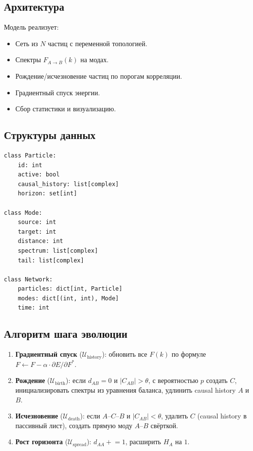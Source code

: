 \documentclass[11pt,a4paper]{article}
\theoremstyle{definition}
\begin{document}
\subsection{Архитектура}

Модель реализует:
\begin{itemize}
    \item Сеть из $N$ частиц с переменной топологией.
    \item Спектры $F_{A \to B}(k)$ на модах.
    \item Рождение/исчезновение частиц по порогам корреляции.
    \item Градиентный спуск энергии.
    \item Сбор статистики и визуализацию.
\end{itemize}

\subsection{Структуры данных}

\begin{verbatim}
class Particle:
    id: int
    active: bool
    causal_history: list[complex]
    horizon: set[int]

class Mode:
    source: int
    target: int
    distance: int
    spectrum: list[complex]
    tail: list[complex]

class Network:
    particles: dict[int, Particle]
    modes: dict[(int, int), Mode]
    time: int
\end{verbatim}

\subsection{Алгоритм шага эволюции}

\begin{enumerate}
    \item \textbf{Градиентный спуск} ($\mathcal{U}_{\text{history}}$): обновить все $F(k)$ по формуле $F \leftarrow F - \alpha \cdot \partial E/\partial F^*$.
    \item \textbf{Рождение} ($\mathcal{U}_{\text{birth}}$): если $d_{AB} = 0$ и $|C_{AB}| > \theta$, с вероятностью $p$ создать $C$, инициализировать спектры из уравнения баланса, удлинить causal history $A$ и $B$.
    \item \textbf{Исчезновение} ($\mathcal{U}_{\text{death}}$): если $A$--$C$--$B$ и $|C_{AB}| < \theta$, удалить $C$ (causal history в пассивный лист), создать прямую моду $A$--$B$ свёрткой.
    \item \textbf{Рост горизонта} ($\mathcal{U}_{\text{spread}}$): $d_{AA} \mathrel{+}= 1$, расширить $H_A$ на $1$.
\end{enumerate}
\end{document}
